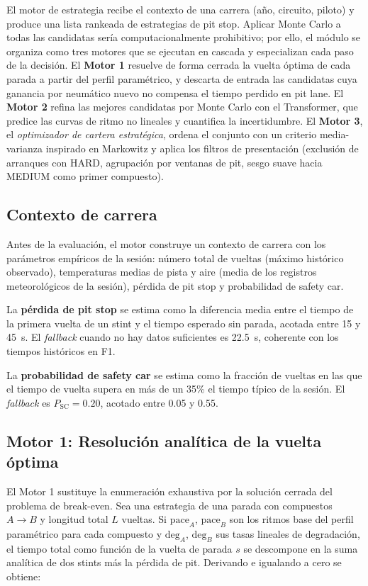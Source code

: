 El motor de estrategia recibe el contexto de una carrera (año, circuito, piloto) y produce una lista rankeada de estrategias de pit stop. Aplicar Monte Carlo a todas las candidatas sería computacionalmente prohibitivo; por ello, el módulo se organiza como tres motores que se ejecutan en cascada y especializan cada paso de la decisión. El \textbf{Motor 1} resuelve de forma cerrada la vuelta óptima de cada parada a partir del perfil paramétrico, y descarta de entrada las candidatas cuya ganancia por neumático nuevo no compensa el tiempo perdido en pit lane. El \textbf{Motor 2} refina las mejores candidatas por Monte Carlo con el Transformer, que predice las curvas de ritmo no lineales y cuantifica la incertidumbre. El \textbf{Motor 3}, el \textit{optimizador de cartera estratégica}, ordena el conjunto con un criterio media-varianza inspirado en Markowitz y aplica los filtros de presentación (exclusión de arranques con HARD, agrupación por ventanas de pit, sesgo suave hacia MEDIUM como primer compuesto).

\subsection{Contexto de carrera}
\label{ssec:race_context}

Antes de la evaluación, el motor construye un contexto de carrera con los parámetros empíricos de la sesión: número total de vueltas (máximo histórico observado), temperaturas medias de pista y aire (media de los registros meteorológicos de la sesión), pérdida de pit stop y probabilidad de safety car.

La \textbf{pérdida de pit stop} se estima como la diferencia media entre el tiempo de la primera vuelta de un stint y el tiempo esperado sin parada, acotada entre 15 y 45~s. El \textit{fallback} cuando no hay datos suficientes es 22.5~s, coherente con los tiempos históricos en F1.

La \textbf{probabilidad de safety car} se estima como la fracción de vueltas en las que el tiempo de vuelta supera en más de un 35\% el tiempo típico de la sesión. El \textit{fallback} es $P_{\text{SC}} = 0.20$, acotado entre 0.05 y 0.55.

\subsection{Motor 1: Resolución analítica de la vuelta óptima}
\label{ssec:motor1}

El Motor 1 sustituye la enumeración exhaustiva por la solución cerrada del problema de break-even. Sea una estrategia de una parada con compuestos $A \to B$ y longitud total $L$ vueltas. Si $\text{pace}_A$, $\text{pace}_B$ son los ritmos base del perfil paramétrico para cada compuesto y $\text{deg}_A$, $\text{deg}_B$ sus tasas lineales de degradación, el tiempo total como función de la vuelta de parada $s$ se descompone en la suma analítica de dos stints más la pérdida de pit. Derivando e igualando a cero se obtiene:

